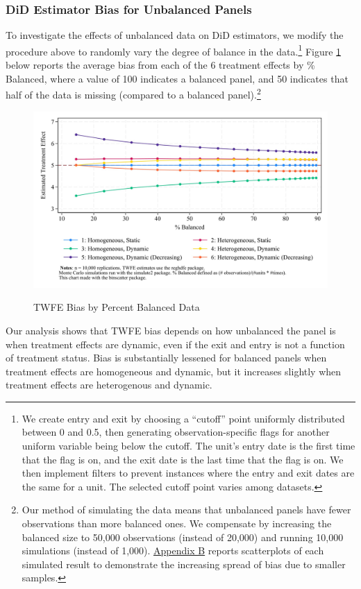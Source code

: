 \documentclass[12pt]{article}
\begin{document}
\subsubsection{DiD Estimator Bias for Unbalanced Panels}
To investigate the effects of unbalanced data on DiD estimators, we modify the procedure above to randomly  vary the degree of balance in the data.\footnote{\label{pcunbalancedfn}We create entry and exit by choosing a “cutoff” point uniformly distributed between 0 and 0.5, then generating observation-specific flags for another uniform variable being below the cutoff. The unit’s entry date is the first time that the flag is on, and the exit date is the last time that the flag is on. We then implement filters to prevent instances where the entry and exit dates are the same for a unit. The selected cutoff point varies among datasets.}  Figure \ref{fig:pc-balance} below reports the average bias from each of the 6 treatment effects by \% Balanced, where a value of 100 indicates a balanced panel, and 50 indicates that half of the data is missing (compared to a balanced panel).\footnote{Our method of simulating the data means that unbalanced panels have fewer observations than more balanced ones. We compensate by increasing the balanced size to 50,000 observations (instead of 20,000) and running 10,000 simulations (instead of 1,000). \hyperref[sec:appendixb]{Appendix B} reports scatterplots of each simulated result to demonstrate the increasing spread of bias due to smaller samples.}
\begin{figure}[H]
    \centering
    \caption{TWFE Bias by Percent Balanced Data}
    \includegraphics[width=5in]{Figures/TWFE Bias by Percent Balanced Crop.jpg}
    \label{fig:pc-balance}
\end{figure}
\noindent
Our analysis shows that TWFE bias depends on how unbalanced the panel is when treatment effects are dynamic, even if the exit and entry is not a function of treatment status. Bias is substantially lessened for balanced panels when treatment effects are homogeneous and dynamic, but it increases slightly when treatment effects are heterogenous and dynamic.
\end{document}
